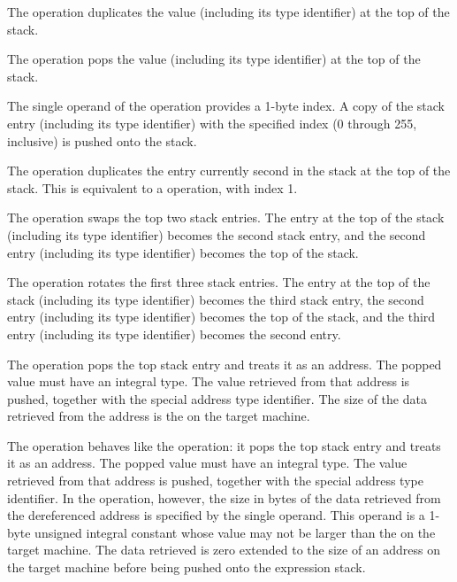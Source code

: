 \begin{enumerate}[1. ]
\itembfnl{\DWOPdupTARG}
The \DWOPdupNAME{} operation duplicates the value (including its 
type identifier) at the top of the stack.

\itembfnl{\DWOPdropTARG}
The \DWOPdropNAME{} operation pops the value (including its type 
identifier) at the top of the stack.

\itembfnl{\DWOPpickTARG}
The single operand of the \DWOPpickNAME{} operation provides a
1-byte index. A copy of the stack entry (including its 
type identifier) with the specified
index (0 through 255, inclusive) is pushed onto the stack.

\itembfnl{\DWOPoverTARG}
The \DWOPoverNAME{} operation duplicates the entry currently second
in the stack at the top of the stack. 
This is equivalent to a
\DWOPpick{} operation, with index 1.  

\itembfnl{\DWOPswapTARG}
The \DWOPswapNAME{} operation swaps the top two stack entries. 
The entry at the top of the stack (including its type identifier)
becomes the second stack entry, and the second entry (including 
its type identifier) becomes the top of the stack.

\itembfnl{\DWOProtTARG}
The \DWOProtNAME{} operation rotates the first three stack
entries. The entry at the top of the stack (including its 
type identifier) becomes the third stack entry, the second 
entry (including its type identifier) becomes the top of 
the stack, and the third entry (including its type identifier)
becomes the second entry.

\itembfnl{\DWOPderefTARG}
The \DWOPderefNAME{} operation pops the top stack entry and 
treats it as an address. The popped value must have an integral type.
The value retrieved from that address is pushed, together with the
special address type identifier. 
The size of the data retrieved from the 
address is the  on the target machine.

\itembfnl{\DWOPderefsizeTARG}
The \DWOPderefsizeNAME{} operation behaves like the 
\DWOPderef{}
operation: it pops the top stack entry and treats it as an
address. The popped value must have an integral type.
The value retrieved from that address is pushed, together with the
special address type identifier. In
the \DWOPderefsizeNAME{} operation, however, the size in bytes
of the data retrieved from the dereferenced address is
specified by the single operand. This operand is a 1-byte
unsigned integral constant whose value may not be larger
than the  on the target machine. The data
retrieved is zero extended to the size of an address on the
target machine before being pushed onto the expression stack.


\end{enumerate}
